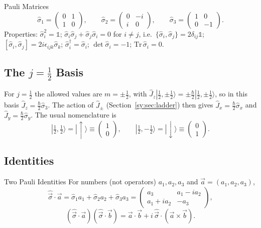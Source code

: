 \documentclass[11pt,a4paper]{article}
\begin{document}
\begin{thm}{Pauli Matrices}
\[
\hat\sigma_1=\begin{pmatrix}0&1\\1&0\end{pmatrix},\qquad
\hat\sigma_2=\begin{pmatrix}0&-i\\i&0\end{pmatrix},\qquad
\hat\sigma_3=\begin{pmatrix}1&0\\0&-1\end{pmatrix}.
\]
Properties: $\hat\sigma_i^2=\mathbb 1$; $\hat\sigma_i\hat\sigma_j+\hat\sigma_j\hat\sigma_i=0$ for $i\ne j$, i.e.\ $\{\hat\sigma_i,\hat\sigma_j\}=2\delta_{ij}\mathbb 1$; $[\hat\sigma_i,\hat\sigma_j]=2i\epsilon_{ijk}\hat\sigma_k$; $\hat\sigma_i^\dagger=\hat\sigma_i$; $\det\hat\sigma_i=-1$; $\mathrm{Tr}\,\hat\sigma_i=0$.
\end{thm}

\subsection{The \texorpdfstring{$j=\tfrac12$}{j=1/2} Basis}
For $j=\tfrac12$ the allowed values are $m=\pm\tfrac12$, with $\hat J_z|\tfrac12,\pm\tfrac12\rangle=\pm\tfrac\hbar2|\tfrac12,\pm\tfrac12\rangle$, so in this basis $\hat J_z=\tfrac\hbar2\hat\sigma_3$. The action of $\hat J_\pm$ (Section~\ref{sy:sec:ladder}) then gives $\hat J_x=\tfrac\hbar2\hat\sigma_x$ and $\hat J_y=\tfrac\hbar2\hat\sigma_y$. The usual nomenclature is
\[
|\tfrac12,\tfrac12\rangle=|\!\uparrow\rangle\equiv\begin{pmatrix}1\\0\end{pmatrix},\qquad
|\tfrac12,-\tfrac12\rangle=|\!\downarrow\rangle\equiv\begin{pmatrix}0\\1\end{pmatrix}.
\]

\subsection{Identities}
\begin{thm}{Two Pauli Identities}
For numbers (not operators) $a_1,a_2,a_3$ and $\vec a=(a_1,a_2,a_3)$,
\[
\hat{\vec\sigma}\cdot\vec a=\hat\sigma_1a_1+\hat\sigma_2a_2+\hat\sigma_3a_3=\begin{pmatrix}a_3&a_1-ia_2\\a_1+ia_2&-a_3\end{pmatrix},
\]
\[
(\hat{\vec\sigma}\cdot\vec a)(\hat{\vec\sigma}\cdot\vec b)=\vec a\cdot\vec b+i\,\hat{\vec\sigma}\cdot(\vec a\times\vec b).
\]
\end{thm}
\end{document}
